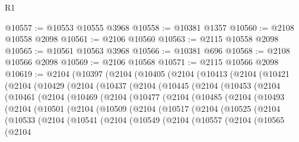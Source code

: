 \begin{lexlean}{R1}
\begin{coremodule}
@10557 := @10553 @10555 @3968
@10558 := @10381 @1357
@10560 := @2108 @10558 @2098
@10561 := @2106 @10560
@10563 := @2115 @10558 @2098
@10565 := @10561 @10563 @3968
@10566 := @10381 @696
@10568 := @2108 @10566 @2098
@10569 := @2106 @10568
@10571 := @2115 @10566 @2098
@10619 := @2104
    (@10397
      (@2104
        (@10405
          (@2104
            (@10413
              (@2104
                (@10421
                  (@2104
                    (@10429
                      (@2104
                        (@10437
                          (@2104
                            (@10445
                              (@2104
                                (@10453
                                  (@2104
                                    (@10461
                                      (@2104
                                        (@10469
                                          (@2104
                                            (@10477
                                              (@2104
                                                (@10485
                                                  (@2104
                                                    (@10493
                                                      (@2104
                                                        (@10501
                                                          (@2104
                                                            (@10509
                                                              (@2104
                                                                (@10517
                                                                  (@2104
                                                                    (@10525
                                                                      (@2104
                                                                        (@10533
                                                                          (@2104
                                                                            (@10541
                                                                              (@2104
                                                                                (@10549
                                                                                  (@2104
                                                                                    (@10557
                                                                                      (@2104
                                                                                        (@10565
                                                                                          (@2104

\end{coremodule}
\end{lexlean}
